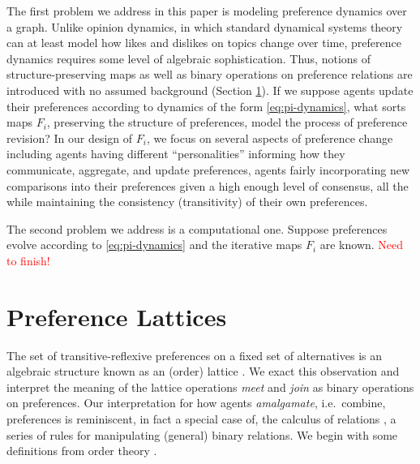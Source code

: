 \documentclass[conference]{ieeeconf}
\newcommand{\N}{\mathcal{N}}
\newcommand{\A}{\mathcal{A}}
\newcommand{\prefers}{\succsim}
\newcommand{\profile}{\boldsymbol{\pi}}
\newcommand{\metaprefers}{\sqsupseteq}
\begin{document}
The first problem we address in this paper is modeling preference dynamics over a graph. Unlike opinion dynamics, in which standard dynamical systems theory can at least model how likes and dislikes on topics change over time, preference dynamics requires some level of algebraic sophistication. Thus, notions of structure-preserving maps as well as binary operations on preference relations are introduced with no assumed background (Section \ref{sec:lattices}). If we suppose agents update their preferences according to dynamics of the form \eqref{eq:pi-dynamics}, what sorts maps $F_i$, preserving the structure of preferences, model the process of preference revision? In our design of $F_i$, we focus on several aspects of preference change including agents having different ``personalities'' informing how they communicate, aggregate, and update preferences, agents fairly incorporating new comparisons into their preferences given a high enough level of consensus, all the while maintaining the consistency (transitivity) of their own preferences.

The second problem we address is a computational one. Suppose preferences evolve according to \eqref{eq:pi-dynamics} and the iterative maps $F_i$ are known. \textcolor{red}{Need to finish!}


\section{Preference Lattices}
\label{sec:lattices}

The set of transitive-reflexive preferences on a fixed set of alternatives is an algebraic structure known as an (order) lattice \cite{birkhoff1940}. We exact this observation and interpret the meaning of the lattice operations \emph{meet} and \emph{join} as binary operations on preferences. Our interpretation for how agents \emph{amalgamate}, i.e.~combine, preferences is reminiscent, in fact a special case of, the calculus of relations \cite{tarski1941}, a series of rules for manipulating (general) binary relations. We begin with some definitions from order theory \cite{roman2008}.
\end{document}
